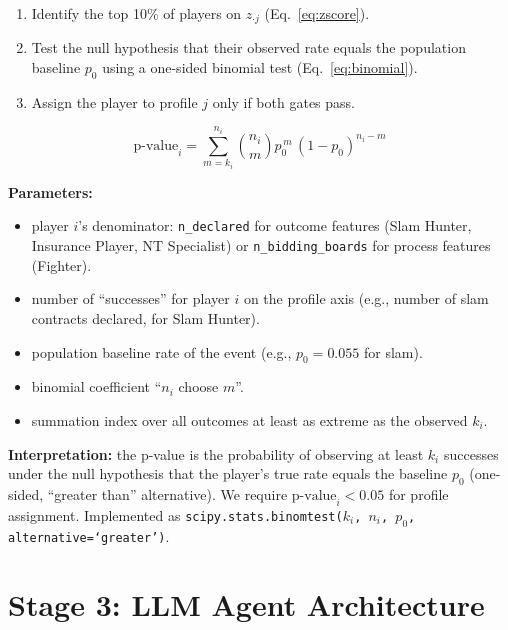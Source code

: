 \documentclass[11pt, a4paper, oneside, openany]{report}
\begin{document}
\begin{enumerate}[leftmargin=*]
    \item Identify the top 10\% of players on $z_{\cdot j}$ (Eq.~\ref{eq:zscore}).
    \item Test the null hypothesis that their observed rate equals the population baseline $p_0$ using a one-sided binomial test (Eq.~\ref{eq:binomial}).
    \item Assign the player to profile $j$ only if both gates pass.
\end{enumerate}

\begin{equation}
\label{eq:binomial}
\mathrm{p\text{-value}}_i = \sum_{m = k_i}^{n_i} \binom{n_i}{m} p_0^{\,m}\, (1 - p_0)^{n_i - m}
\end{equation}

\noindent\textbf{Parameters:}
\begin{itemize}[leftmargin=2.2cm, itemsep=0pt, topsep=2pt]
    \item[$n_i$] player $i$'s denominator: \texttt{n\_declared} for outcome features (Slam Hunter, Insurance Player, NT Specialist) or \texttt{n\_bidding\_boards} for process features (Fighter).
    \item[$k_i$] number of ``successes'' for player $i$ on the profile axis (e.g., number of slam contracts declared, for Slam Hunter).
    \item[$p_0$] population baseline rate of the event (e.g., $p_0 = 0.055$ for slam).
    \item[$\binom{n_i}{m}$] binomial coefficient ``$n_i$ choose $m$''.
    \item[$m$] summation index over all outcomes at least as extreme as the observed $k_i$.
\end{itemize}

\noindent\textbf{Interpretation:} the p-value is the probability of observing at least $k_i$ successes under the null hypothesis that the player's true rate equals the baseline $p_0$ (one-sided, ``greater than'' alternative). We require $\mathrm{p\text{-value}}_i < 0.05$ for profile assignment. Implemented as \texttt{scipy.stats.binomtest($k_i$, $n_i$, $p_0$, alternative=`greater')}.

\section{Stage 3: LLM Agent Architecture}
\label{sec:agent_arch}
\end{document}
